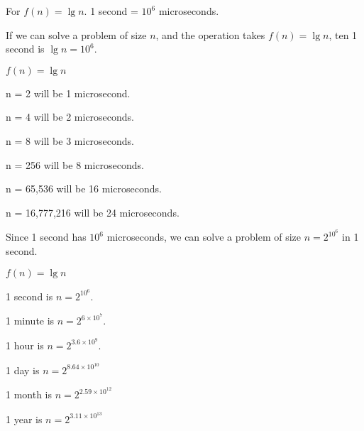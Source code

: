 \documentclass[a4paper,12pt]{article}
\begin{document}

For $f(n) = \lg n$. 1 second = $10^6$ microseconds.

If we can solve a problem of size $n$, and the operation 
takes $f(n) = \lg n$, ten 1 second is $\lg n = 10^6$.

$f(n) = \lg n$

n = 2 will be 1 microsecond.

n = 4 will be 2 microseconds.

n = 8 will be 3 microseconds.

n = 256 will be 8 microseconds.

n = 65,536 will be 16 microseconds.

n = 16,777,216 will be 24 microseconds.

Since 1 second has $10^6$ microseconds, we can solve a problem of size $n = 2^{10^6}$ in 1 second.

$f(n) = \lg n$

1 second is $n = 2^{10^6}$.

1 minute is $n =2^{6 \times 10^7}  $.

1 hour is $n = 2^{3.6 \times 10^9}$.

1 day is $n = 2^{8.64 \times 10^{10}}$

1 month is $n = 2^{2.59 \times 10^{12}}$

1 year is $n = 2^{3.11 \times 10^{13}}$
\end{document}
